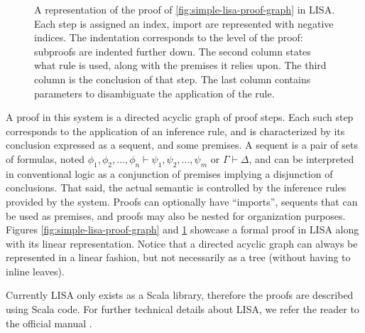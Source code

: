 \begin{figure}[H]
  \centering
  
  \caption[Proof in LISA]{A representation of the proof of \autoref{fig:simple-lisa-proof-graph} in LISA. Each step is assigned an index, import are represented with negative indices. The indentation corresponds to the level of the proof: subproofs are indented further down. The second column states what rule is used, along with the premises it relies upon. The third column is the conclusion of that step. The last column contains parameters to disambiguate the application of the rule.}
  \label{fig:simple-lisa-proof}
\end{figure}

A proof in this system is a directed acyclic graph of proof steps. Each such step corresponds to the application of an inference rule, and is characterized by its conclusion expressed as a sequent, and some premises. A sequent is a pair of sets of formulas, noted $\phi_1, \phi_2, ..., \phi_n \vdash \psi_1, \psi_2, ..., \psi_m$ or $\Gamma \vdash \Delta$, and can be interpreted in conventional logic as a conjunction of premises implying a disjunction of conclusions. That said, the actual semantic is controlled by the inference rules provided by the system. Proofs can optionally have ``imports'', sequents that can be used as premises, and proofs may also be nested for organization purposes. Figures \ref{fig:simple-lisa-proof-graph} and \ref{fig:simple-lisa-proof} showcase a formal proof in LISA along with its linear representation. Notice that a directed acyclic graph can always be represented in a linear fashion, but not necessarily as a tree (without having to inline leaves).

Currently LISA only exists as a Scala library, therefore the proofs are described using Scala code. For further technical details about LISA, we refer the reader to the official manual \cite{Guilloud2022-2}.
